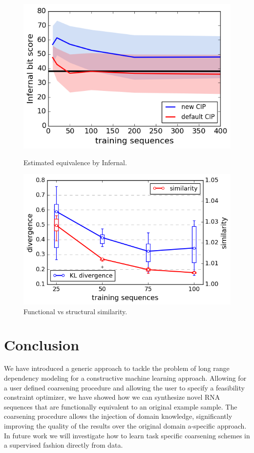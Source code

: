 \documentclass{article}
\begin{document}
\begin{figure}[ht]
      \centering
  \begin{minipage}[b]{0.47\textwidth}
    \includegraphics[width=\textwidth]{images/infernal_abstr.png}
    \caption{Estimated equivalence by Infernal.}
      \label{infeval}
  \end{minipage}
  \hfill
  \begin{minipage}[b]{0.52\textwidth}
    \includegraphics[width=\textwidth]{images/learningcurve.png}
    \caption{Functional vs structural similarity.}
     \label{learncurve}
  \end{minipage}
\end{figure}

 
\section{Conclusion}

We have introduced a generic approach to tackle the problem of long range
dependency modeling for a constructive machine learning approach. Allowing for
a user defined coarsening procedure and allowing the user to specify a
feasibility constraint optimizer, we have showed how we can synthesize novel
RNA sequences that are functionally equivalent to an original example sample.
The coarsening procedure allows the injection of domain knowledge,
significantly improving the quality of the results over the original domain
a-specific approach. In future work we will investigate how to learn task
specific coarsening schemes in a supervised fashion directly from data.



\end{document}
